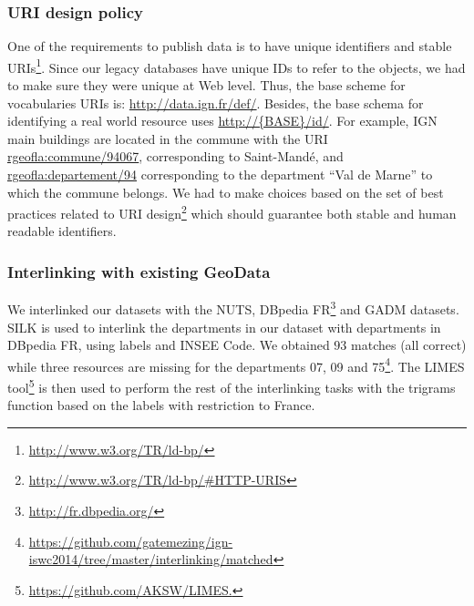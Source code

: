 \subsubsection{URI design policy} \label{sec:urigeofla}
One of the requirements to publish data is to have unique identifiers and stable URIs\footnote{\url{http://www.w3.org/TR/ld-bp/}}. Since our legacy databases have unique IDs to refer to the objects, we had to make sure they were unique at Web level. Thus, the base scheme for vocabularies URIs is: \url{http://data.ign.fr/def/}. Besides, the base schema for identifying a real world resource uses \url{http://{BASE}/id/}. For example, IGN main buildings  are located in the commune with the URI \url{rgeofla:commune/94067}, corresponding to Saint-Mand\'{e}, and \url{rgeofla:departement/94} corresponding to the department ``Val de Marne'' to which the commune belongs.
We had to make choices based on the set of best practices related to URI design\footnote{\url{http://www.w3.org/TR/ld-bp/\#HTTP-URIS}} which should guarantee both stable and human readable identifiers.


\subsubsection{Interlinking with existing GeoData} \label{sec:mapping}
We interlinked our datasets with the NUTS, DBpedia FR\footnote{\url{http://fr.dbpedia.org/}} and GADM datasets. SILK \cite{jentzsch2010silk} is used to interlink the departments in our dataset with departments in DBpedia FR, using labels and INSEE Code. We obtained $93$ matches (all correct) while three resources are missing for the departments 07, 09 and 75\footnote{\url{https://github.com/gatemezing/ign-iswc2014/tree/master/interlinking/matched}}. The
LIMES tool\footnote{\url{https://github.com/AKSW/LIMES.}} is then used to perform the rest of the interlinking tasks \cite{ngon13} with the trigrams function based on the labels with restriction to France.

